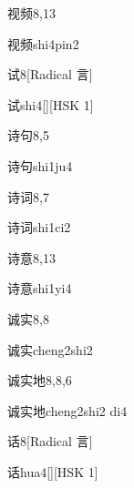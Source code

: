 \begin{entry}{视频}{8,13}
  \begin{phonetics}{视频}{shi4pin2}
  \end{phonetics}
\end{entry}

\begin{entry}{试}{8}[Radical 言]
  \begin{phonetics}{试}{shi4}[][HSK 1]
  \end{phonetics}
\end{entry}

\begin{entry}{诗句}{8,5}
  \begin{phonetics}{诗句}{shi1ju4}
  \end{phonetics}
\end{entry}

\begin{entry}{诗词}{8,7}
  \begin{phonetics}{诗词}{shi1ci2}
  \end{phonetics}
\end{entry}

\begin{entry}{诗意}{8,13}
  \begin{phonetics}{诗意}{shi1yi4}
  \end{phonetics}
\end{entry}

\begin{entry}{诚实}{8,8}
  \begin{phonetics}{诚实}{cheng2shi2}
  \end{phonetics}
\end{entry}

\begin{entry}{诚实地}{8,8,6}
  \begin{phonetics}{诚实地}{cheng2shi2 di4}
  \end{phonetics}
\end{entry}

\begin{entry}{话}{8}[Radical 言]
  \begin{phonetics}{话}{hua4}[][HSK 1]
  \end{phonetics}
\end{entry}

